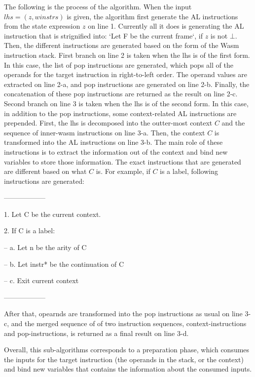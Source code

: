 The following is the process of the algorithm.
When the input $lhs = (z, winstrs)$ is given, the algorithm first
generate the AL instructions from the state expression $z$ on line 1.
Currently all it does is generating the AL instruction that is strignified into:
`Let F be the current frame`, if $z$ is not $\bot$. Then, the different instructions are
generated based on the form of the Wasm instruction stack. First branch on line 2 is taken
when the lhs is of the first form. In this case, the list of pop instructions are generated,
which pops all of the operands for the target instruction in right-to-left order.
The operand values are extracted on line 2-a, and pop instructions are generated on line 2-b.
Finally, the concatenation of these pop instructions are returned as the result on line 2-c.
Second branch on line 3 is taken when the lhs is of the second form.
In this case, in addition to the pop instructions, some context-related AL instructions are prepended.
First, the lhs is decomposed into the outter-most context $C$ and the sequence of inner-wasm instructions on line 3-a.
Then, the context $C$ is transformed into the AL instructions on line 3-b.
The main role of these instructions is to extract the information out of the context
and bind new variables to store those information.
The exact instructions that are generated are different based on what $C$ is.
For example, if $C$ is a label, following instructions are generated:

------------------

1. Let C be the current context.

2. If C is a label:

-- a. Let n be the arity of C

-- b. Let instr* be the continuation of C

-- c. Exit current context

------------------

After that, opearnds are transformed into the pop instructions as usual on line 3-c,
and the merged sequence of of two instruction sequences, context-instructions and pop-instructions, is
returned as a final result on line 3-d.

Overall, this sub-algorithms corresponds to a preparation phase, which consumes the
inputs for the target instruction (the operands in the stack, or the context) and
bind new variables that contains the information about the consumed inputs.

